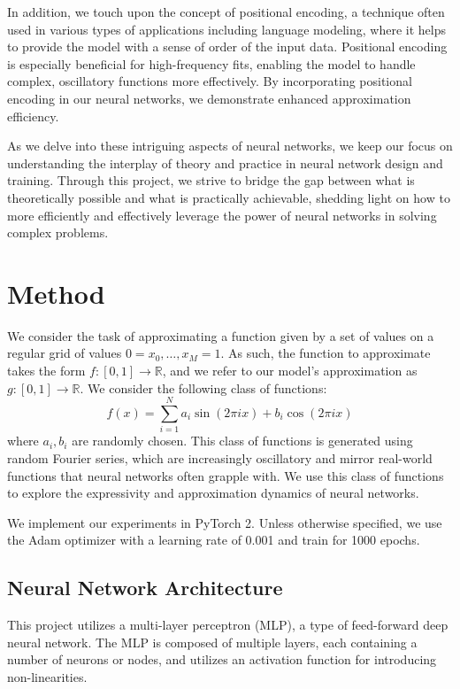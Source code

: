 \documentclass[11pt]{article}
\begin{document}
In addition, we touch upon the concept of positional encoding, a technique often used in various types of applications including language modeling, where it helps to provide the model with a sense of order of the input data. Positional encoding is especially beneficial for high-frequency fits, enabling the model to handle complex, oscillatory functions more effectively. By incorporating positional encoding in our neural networks, we demonstrate enhanced approximation efficiency.

As we delve into these intriguing aspects of neural networks, we keep our focus on understanding the interplay of theory and practice in neural network design and training. Through this project, we strive to bridge the gap between what is theoretically possible and what is practically achievable, shedding light on how to more efficiently and effectively leverage the power of neural networks in solving complex problems.

\section{Method}
We consider the task of approximating a function given by a set of values on a regular grid of values {$0 = x_0, \hdots, x_M = 1$}. As such, the function to approximate takes the form $f: [0, 1] \rightarrow \mathbb{R}$, and we refer to our model's approximation as $g: [0, 1] \rightarrow \mathbb{R}$. We consider the following class of functions:
\begin{equation}
    f(x) = \sum_{i=1}^{N} a_i \sin(2\pi i x) + b_i \cos(2\pi i x)
\end{equation}
where $a_i, b_i$ are randomly chosen. This class of functions is generated using random Fourier series, which are increasingly oscillatory and mirror real-world functions that neural networks often grapple with. We use this class of functions to explore the expressivity and approximation dynamics of neural networks.

We implement our experiments in PyTorch 2. Unless otherwise specified, we use the Adam optimizer with a learning rate of 0.001 and train for 1000 epochs.
\subsection{Neural Network Architecture}
This project utilizes a multi-layer perceptron (MLP), a type of feed-forward deep neural network. The MLP is composed of multiple layers, each containing a number of neurons or nodes, and utilizes an activation function for introducing non-linearities.
\end{document}
